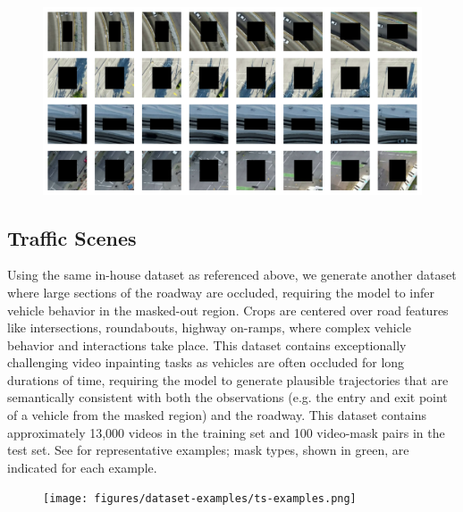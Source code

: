 \begin{figure}[t]
    \begin{center}
        \centering
        \captionsetup{type=figure}
        \includegraphics[width=\linewidth]{figures/dataset-examples/bg-examples.pdf}
        \label{fig:bg-examples}
    \end{center}
\end{figure}
\subsection{Traffic Scenes}
Using the same in-house dataset as referenced above, we generate another dataset where large sections of the roadway are occluded, requiring the model to infer vehicle behavior in the masked-out region. Crops are centered over road features like intersections, roundabouts, highway on-ramps, \etc where complex vehicle behavior and interactions take place. This dataset contains exceptionally challenging video inpainting tasks as vehicles are often occluded for long durations of time, requiring the model to generate plausible trajectories that are semantically consistent with both the observations (e.g. the entry and exit point of a vehicle from the masked region) and the roadway. This dataset contains approximately 13,000 videos in the training set and 100 video-mask pairs in the test set. See  for representative examples; mask types, shown in green, are indicated for each example.
\begin{figure}[t]
    \begin{center}
        \centering
        \captionsetup{type=figure}
        \texttt{[image: figures/dataset-examples/ts-examples.png]}
        \label{fig:ts-examples}
    \end{center}
    \end{figure}
